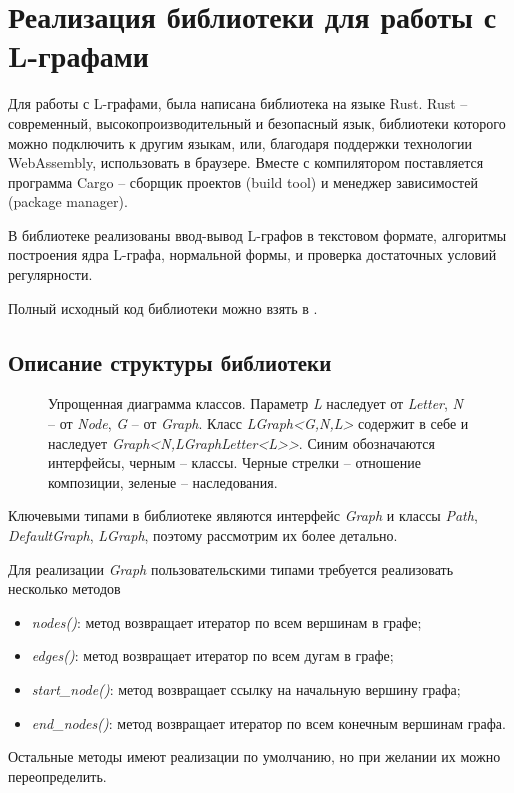
\chapter{Реализация библиотеки для работы с L-графами}

Для работы с L-графами, была написана библиотека на языке Rust. 
Rust -- современный, высокопроизводительный и безопасный язык, библиотеки которого
можно подключить к другим языкам, или, благодаря поддержки технологии WebAssembly, использовать
в браузере. Вместе с компилятором поставляется программа Cargo -- сборщик проектов (build tool) и менеджер
зависимостей (package manager). 

В библиотеке реализованы ввод-вывод L-графов в текстовом формате, 
алгоритмы построения ядра L-графа, нормальной формы, и проверка достаточных условий регулярности.

Полный исходный код библиотеки можно взять в \cite{github_link}.

\section{Описание структуры библиотеки}

\begin{figure}[h]
    \centering
    
    \caption{
        Упрощенная диаграмма классов. Параметр \emph{L} наследует от \emph{Letter}, \emph{N} -- от \emph{Node}, \emph{G} -- от \emph{Graph}.
        Класс \emph{LGraph<G,N,L>} содержит в себе и наследует \emph{Graph<N,LGraphLetter<L>{}>}.
        Синим обозначаются интерфейсы, черным -- классы.
        Черные стрелки -- отношение композиции, зеленые -- наследования.
    }
    \label{arch-image}
\end{figure}

Ключевыми типами в библиотеке являются интерфейс \emph{Graph} и классы \emph{Path}, \emph{DefaultGraph}, \emph{LGraph}, 
поэтому рассмотрим их более детально.

Для реализации \emph{Graph} пользовательскими типами требуется реализовать несколько методов
\begin{itemize}
    \item \emph{nodes()}: метод возвращает итератор по всем вершинам в графе;
    \item \emph{edges()}: метод возвращает итератор по всем дугам в графе;
    \item \emph{start\_node()}: метод возвращает ссылку на начальную вершину графа;
    \item \emph{end\_nodes()}: метод возвращает итератор по всем конечным вершинам графа.
\end{itemize}
Остальные методы имеют реализации по умолчанию, но при желании их можно переопределить.

